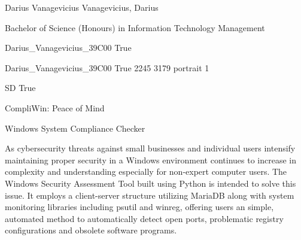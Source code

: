 
\begingroup{}\relax



\def\Key{Darius_Vanagevicius_39C00}

{Darius Vanagevicius}
{Vanagevicius, Darius}

{Bachelor of Science (Honours) in Information Technology Management}

{Darius_Vanagevicius_39C00}
{True}

{Darius_Vanagevicius_39C00}
{True}
{2245}
{3179}
{portrait}
{1}

{SD}
{True}

{CompliWin: Peace of Mind}

{Windows System Compliance Checker}

{As cybersecurity threats against small businesses and individual users intensify maintaining proper
security in a Windows environment continues to increase in complexity and understanding especially
for non-expert computer users. The Windows Security Assessment Tool built using Python is
intended to solve this issue. It employs a client-server structure utilizing MariaDB along with system
monitoring libraries including psutil and winreg, offering users an simple, automated method to
automatically detect open ports, problematic registry configurations and obsolete software programs.}

